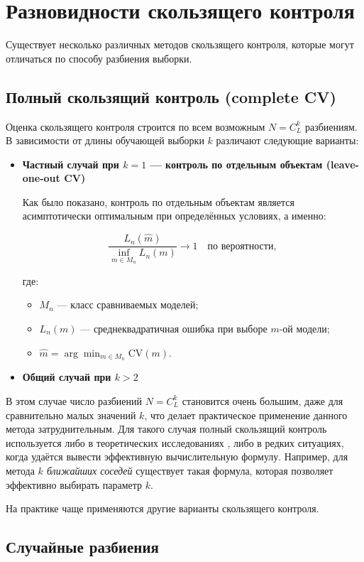 \section{Разновидности скользящего контроля}
Существует несколько различных методов скользящего контроля, которые могут отличаться по способу разбиения выборки.
\subsection{Полный скользящий контроль (complete CV)}
Оценка скользящего контроля строится по всем возможным $N = C_L^k$ разбиениям. В зависимости от длины обучающей выборки $k$ различают следующие варианты:
\begin{itemize}

\item \textbf{Частный случай при $k=1$ — контроль по отдельным объектам (leave-one-out CV)}

Как было показано, контроль по отдельным объектам является асимптотически оптимальным при определённых условиях, а именно:

\[
\frac{L_n(\hat{m})}{\inf_{m \in M_n} L_n(m)} \to 1 \quad \text{по вероятности},
\]

где:

\begin{itemize}
  \item $M_n$ — класс сравниваемых моделей;
  \item $L_n(m)$ — среднеквадратичная ошибка при выборе $m$-ой модели;
  \item $\hat{m} = \arg \min_{m \in M_n} \text{CV}(m)$.
\end{itemize}

\item \textbf{Общий случай при $k>2$}
\end{itemize}

В этом случае число разбиений $N = C_L^k$ становится очень большим, даже для сравнительно малых значений $k$, что делает практическое применение данного метода затруднительным. Для такого случая полный скользящий контроль используется либо в теоретических исследованиях \cite{Voronov2004}, либо в редких ситуациях, когда удаётся вывести эффективную вычислительную формулу. Например, для метода \textit{$k$ ближайших соседей} существует такая формула, которая позволяет эффективно выбирать параметр $k$.

\medskip
На практике чаще применяются другие варианты скользящего контроля.

\subsection{Случайные разбиения}

